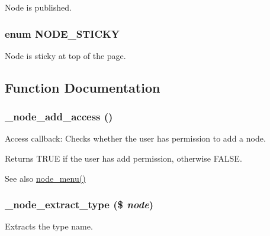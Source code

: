 \label{node_8module_a59b1bca644d4464345020a98baef8824}
Node is published. \hypertarget{node_8module_a90802a9d8cbd9d228e2c40f500548e40}{
\subsubsection[{NODE\_\-STICKY}]{\setlength{\rightskip}{0pt plus 5cm}enum {\bf NODE\_\-STICKY}}}
\label{node_8module_a90802a9d8cbd9d228e2c40f500548e40}
Node is sticky at top of the page. 

\subsection{Function Documentation}
\hypertarget{node_8module_afd478b7c5d729b1f2affdaf30a6999c3}{
\subsubsection[{\_\-node\_\-add\_\-access}]{\setlength{\rightskip}{0pt plus 5cm}\_\-node\_\-add\_\-access ()}}
\label{node_8module_afd478b7c5d729b1f2affdaf30a6999c3}
Access callback: Checks whether the user has permission to add a node.

\begin{DoxyReturn}{Returns}
TRUE if the user has add permission, otherwise FALSE.
\end{DoxyReturn}
\begin{DoxySeeAlso}{See also}
\hyperlink{node_8module_a15e8d85a7559f22b8f2c77c1d5dfac63}{node\_\-menu()} 
\end{DoxySeeAlso}
\hypertarget{node_8module_af5a973d62c30cddb155f6b5609439efe}{
\subsubsection[{\_\-node\_\-extract\_\-type}]{\setlength{\rightskip}{0pt plus 5cm}\_\-node\_\-extract\_\-type (\$ {\em node})}}
\label{node_8module_af5a973d62c30cddb155f6b5609439efe}
Extracts the type name.


